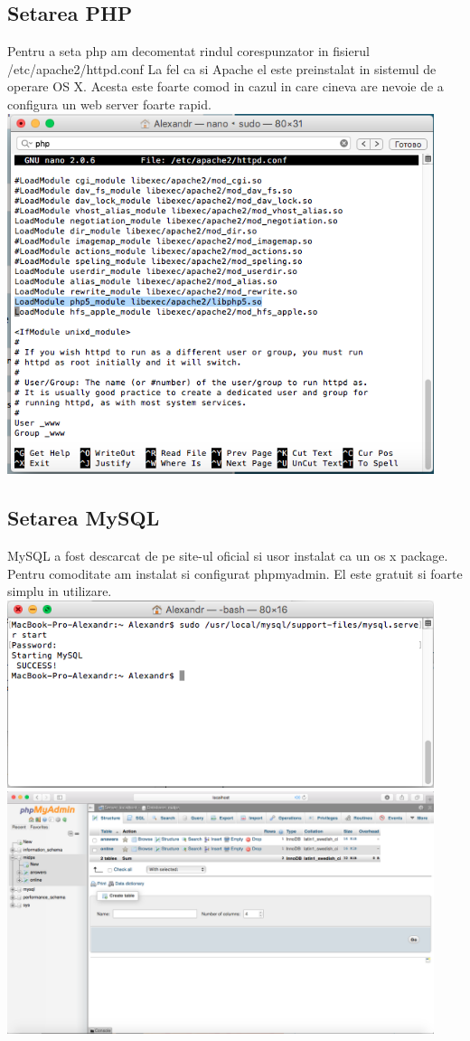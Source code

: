 \documentclass[12pt]{article}
\begin{document}
\subsection{Setarea PHP}
Pentru a seta php am decomentat rindul corespunzator in fisierul /etc/apache2/httpd.conf
La fel ca si Apache el este preinstalat in sistemul de operare OS X. Acesta este foarte comod in cazul in care cineva are nevoie de a configura un web server foarte rapid.
\\
\includegraphics[width=12.5cm]{images/2}
\subsection{Setarea MySQL}
MySQL a fost descarcat de pe site-ul oficial si usor instalat ca un os x package. Pentru comoditate am instalat si configurat phpmyadmin. El este gratuit si foarte simplu in utilizare.\\
\includegraphics[width=12.5cm]{images/3}\\
\includegraphics[width=12.5cm]{images/4}
\end{document}
